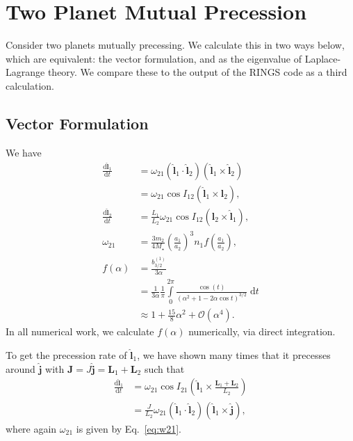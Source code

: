 \documentclass[11pt,
        usenames, %
        dvipsnames %
    ]{article}
\newcommand*{\rd}[2]{\frac{\mathrm{d}#1}{\mathrm{d}#2}}
\newcommand*{\bm}[1]{\boldsymbol{\mathbf{#1}}}
\newcommand*{\uv}[1]{\hat{\bm{#1}}}
\newcommand*{\p}[1]{\left(#1\right)}
\begin{document}
\onehalfspacing

\section{Two Planet Mutual Precession}

Consider two planets mutually precessing. We calculate this in two ways below,
which are equivalent: the vector formulation, and as the eigenvalue of
Laplace-Lagrange theory. We compare these to the output of the RINGS code as a
third calculation.

\subsection{Vector Formulation}

We have
\begin{align}
    \rd{\uv{l}_1}{t} &= \omega_{21}\p{\uv{l}_1 \cdot \uv{l}_2}
            \p{\uv{l}_1 \times \uv{l}_2}\nonumber\\
        &= \omega_{21}\cos I_{12}
            \p{\uv{l}_1 \times \uv{l}_2},\\
    \rd{\uv{l}_2}{t} &= \frac{L_1}{L_2}\omega_{21}\cos I_{12}
        \p{\uv{l}_2 \times \uv{l}_1},\\
    \omega_{21}
        &= \frac{3 m_2}{4 M_\star}\p{\frac{a_1}{a_2}}^3 n_1
            f\p{\frac{a_1}{a_2}}\label{eq:w21},\\
    f\p{\alpha} &= \frac{b_{3/2}^{(1)}}{3\alpha}\nonumber\\
        &= \frac{1}{3\alpha}
            \frac{1}{\pi}\int\limits_0^{2\pi}
                \frac{\cos \p{t}}{
                \p{\alpha^2 + 1 - 2\alpha \cos t}^{3/2}}\;\mathrm{d}t\nonumber\\
        &\approx 1 + \frac{15}{8}\alpha^2 + \mathcal{O}\p{\alpha^4}.
\end{align}
In all numerical work, we calculate $f(\alpha)$ numerically, via direct
integration.

To get the precession rate of $\uv{l}_1$, we have shown many times that it
precesses around $\uv{j}$ with $\bm{J} = J\uv{j} = \bm{L}_1 + \bm{L}_2$ such
that
\begin{align}
    \rd{\uv{l}_1}{t} &= \omega_{21}\cos I_{21}
            \p{\uv{l}_1 \times \frac{\bm{L}_1 + \bm{L}_2}{L_2}}\nonumber\\
        &= \frac{J}{L_2}
            \omega_{21}\p{\uv{l}_1 \cdot \uv{l}_2}
                \p{\uv{l}_1 \times \uv{j}}\label{eq:2p_vec},
\end{align}
where again $\omega_{21}$ is given by Eq.~\eqref{eq:w21}.
\end{document}
